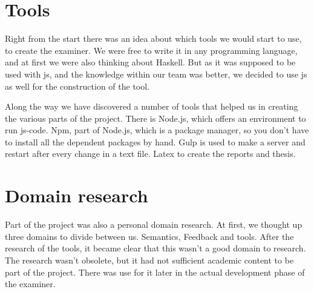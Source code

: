 \section{Tools}

Right from the start there was an idea about which tools we would start to use, to create the examiner. We were free to write it in any programming language, and
at first we were also thinking about Haskell.
But as it was supposed to be used with \gls{js}, and the knowledge within our
team was better, we decided to use \gls{js} as well for the construction of the tool. 

Along the way we have discovered a number of tools that helped us in creating the various parts of the project.
There is Node.js, which offers an environment to run \gls{js-code}.
Npm, part of Node.js, which is a package manager, so you don't have to install
all the dependent packages by hand.
Gulp is used to make a server and restart after every change in a text file.
Latex to create the reports and thesis.


\section{Domain research}
Part of the project was also a personal domain research. At first, we thought up
three domains to divide between us.
Semantics, Feedback and tools.
After the research of the tools, it became clear that this wasn't a good domain
to research.
The research wasn't obsolete, but it had not sufficient academic content to be
part of the project.
There was use for it later in the actual development phase of the \gls{examiner}.